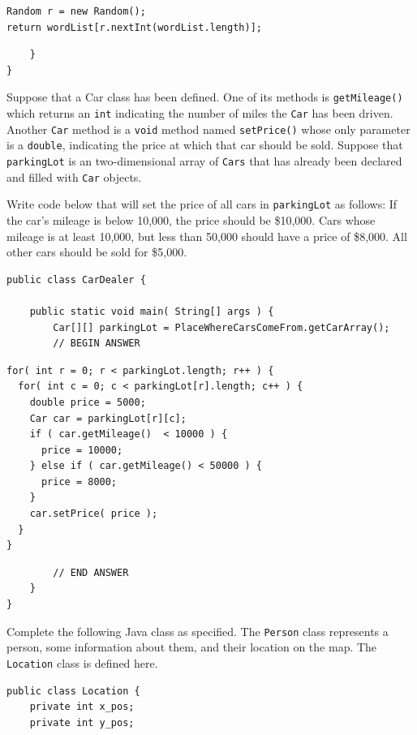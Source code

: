 \documentclass[11pt,answers]{exam}
\begin{document}
\begin{questions}
\begin{solution}[2.5in]
\begin{lstlisting}
Random r = new Random();
return wordList[r.nextInt(wordList.length)];
\end{lstlisting}
\end{solution}

\begin{verbatim}	
    }	
}	
\end{verbatim}

\newpage
\question[12] Suppose that a Car class has been defined.  One of its methods is {\tt getMileage()} which returns an {\tt int} indicating the number of miles the {\tt Car} has been driven.  Another {\tt Car} method is a {\tt void} method named {\tt setPrice()} whose only parameter is a {\tt double}, indicating the price at which that car should be sold.  Suppose that {\tt parkingLot} is an two-dimensional array of {\tt Cars} that has already been declared and filled with {\tt Car} objects.
\par
Write code below that will set the price of all cars in {\tt parkingLot}  as follows: If the car’s mileage is below 10,000, the price should be \$10,000.  Cars whose mileage is at least 10,000, but less than 50,000 should have a price of \$8,000.  All other cars should be sold for \$5,000.

\begin{verbatim}
public class CarDealer {

    public static void main( String[] args ) {
        Car[][] parkingLot = PlaceWhereCarsComeFrom.getCarArray();
        // BEGIN ANSWER
\end{verbatim}

\begin{solution}[4.5in]
\begin{lstlisting}
for( int r = 0; r < parkingLot.length; r++ ) {
  for( int c = 0; c < parkingLot[r].length; c++ ) {
    double price = 5000;
    Car car = parkingLot[r][c];
    if ( car.getMileage()  < 10000 ) {
      price = 10000;
    } else if ( car.getMileage() < 50000 ) {
      price = 8000;
    }
    car.setPrice( price );
  }
}	
\end{lstlisting}
\end{solution}

\begin{verbatim}
        // END ANSWER
    }
}	
\end{verbatim}
 
\newpage

\question[13] Complete the following Java class as specified.  The {\tt Person} class represents a person, some information about them, and their location on the map.   The {\tt Location} class is defined here.
\begin{lstlisting}
public class Location {
	private int x_pos;
	private int y_pos;
	

\end{lstlisting}
\end{questions}
\end{document}

